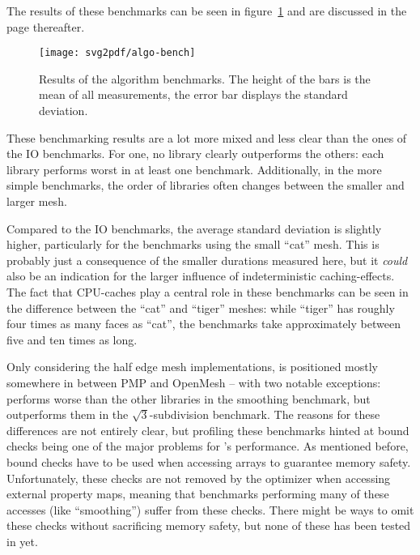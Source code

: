 The results of these benchmarks can be seen in figure~\ref{fig:algo-benchmark} and are discussed in the page thereafter.

\begin{figure}[p]
  \centering
  \centerline{
    \texttt{[image: svg2pdf/algo-bench]}
  }
  \vspace{1cm}
  \caption{
    Results of the algorithm benchmarks.
    The height of the bars is the mean of all measurements, the error bar displays the standard deviation.
  }
  \label{fig:algo-benchmark}
\end{figure}

\newpage

These benchmarking results are a lot more mixed and less clear than the ones of the IO benchmarks.
For one, no library clearly outperforms the others: each library performs worst in at least one benchmark.
Additionally, in the more simple benchmarks, the order of libraries often changes between the smaller and larger mesh.

Compared to the IO benchmarks, the average standard deviation is slightly higher, particularly for the benchmarks using the small \enquote{cat} mesh.
This is probably just a consequence of the smaller durations measured here, but it \emph{could} also be an indication for the larger influence of indeterministic caching-effects.
The fact that CPU-caches play a central role in these benchmarks can be seen in the difference between the \enquote{cat} and \enquote{tiger} meshes:
while \enquote{tiger} has roughly four times as many faces as \enquote{cat}, the benchmarks take approximately between five and ten times as long.

Only considering the half edge mesh implementations,  is positioned mostly somewhere in between PMP and OpenMesh -- with two notable exceptions:
 performs worse than the other libraries in the smoothing benchmark, but outperforms them in the $\sqrt{3}$-subdivision benchmark.
The reasons for these differences are not entirely clear, but profiling these benchmarks hinted at bound checks being one of the major problems for 's performance.
As mentioned before, bound checks have to be used when accessing arrays to guarantee memory safety.
Unfortunately, these checks are not removed by the optimizer when accessing external property maps, meaning that benchmarks performing many of these accesses (like \enquote{smoothing}) suffer from these checks.
There might be ways to omit these checks without sacrificing memory safety, but none of these has been tested in  yet.

